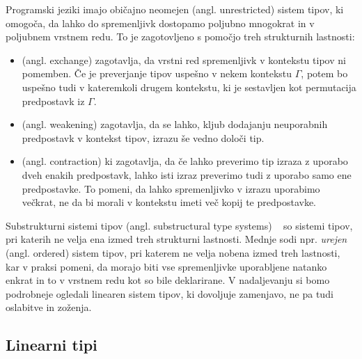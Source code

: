 Programski jeziki imajo običajno neomejen (angl. unrestricted) sistem tipov, ki omogoča, da lahko do spremenljivk dostopamo poljubno mnogokrat in v poljubnem vrstnem redu. To je zagotovljeno s pomočjo treh strukturnih lastnosti:
\begin{itemize}
    \itemsep 0em
    \item {} (angl. exchange) zagotavlja, da vrstni red spremenljivk v kontekstu tipov ni pomemben. Če je preverjanje tipov uspešno v nekem kontekstu $\Gamma$, potem bo uspešno tudi v kateremkoli drugem kontekstu, ki je sestavljen kot permutacija predpostavk iz $\Gamma$.
    \item {} (angl. weakening) zagotavlja, da se lahko, kljub dodajanju neuporabnih predpostavk v kontekst tipov, izrazu še vedno določi tip.
    \item {} (angl. contraction) ki zagotavlja, da če lahko preverimo tip izraza z uporabo dveh enakih predpostavk, lahko isti izraz preverimo tudi z uporabo samo ene predpostavke. To pomeni, da lahko spremenljivko v izrazu uporabimo večkrat, ne da bi morali v kontekstu imeti več kopij te predpostavke.
\end{itemize}

Substrukturni sistemi tipov (angl. substructural type systems) ~\cite{pierce2004advanced} so sistemi tipov, pri katerih ne velja ena izmed treh strukturni lastnosti. Mednje sodi npr. \textit{urejen} (angl. ordered) sistem tipov, pri katerem ne velja nobena izmed treh lastnosti, kar v praksi pomeni, da morajo biti vse spremenljivke uporabljene natanko enkrat in to v vrstnem redu kot so bile deklarirane. V nadaljevanju si bomo podrobneje ogledali linearen sistem tipov, ki dovoljuje zamenjavo, ne pa tudi oslabitve in zoženja.

\subsection{Linearni tipi}
\label{sec:linearni-tipi}


